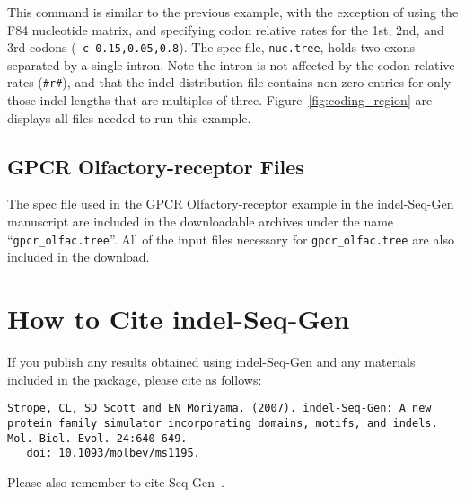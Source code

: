 \documentclass[10pt]{article}
\begin{document}
This command is similar to the previous example, with the exception of using the F84 nucleotide matrix, and specifying codon relative rates for the 1st, 2nd, and 3rd codons ({\tt -c 0.15,0.05,0.8}). The spec file, {\tt nuc.tree}, holds two exons separated by a single intron. Note the intron is not affected by the codon relative rates ({\tt \#r\#}), and that the indel distribution file contains non-zero entries for only those indel lengths that are multiples of three. Figure~\ref{fig:coding_region} are displays all files needed to run this example.

\subsection{GPCR Olfactory-receptor Files}

The spec file used in the GPCR Olfactory-receptor example in the indel-Seq-Gen manuscript are included in the downloadable archives under the name ``{\tt gpcr\_olfac.tree}''.  All of the input files necessary for {\tt gpcr\_olfac.tree} are also included in the download.

\section{How to Cite indel-Seq-Gen}

If you publish any results obtained using indel-Seq-Gen and any materials included in the
package, please cite as follows:

\begin{verbatim}
Strope, CL, SD Scott and EN Moriyama. (2007). indel-Seq-Gen: A new protein family simulator incorporating domains, motifs, and indels. Mol. Biol. Evol. 24:640-649.
   doi: 10.1093/molbev/ms1195.
\end{verbatim}

Please also remember to cite Seq-Gen~\cite{Rambaut97}.

\newpage
\appendix
\end{document}

